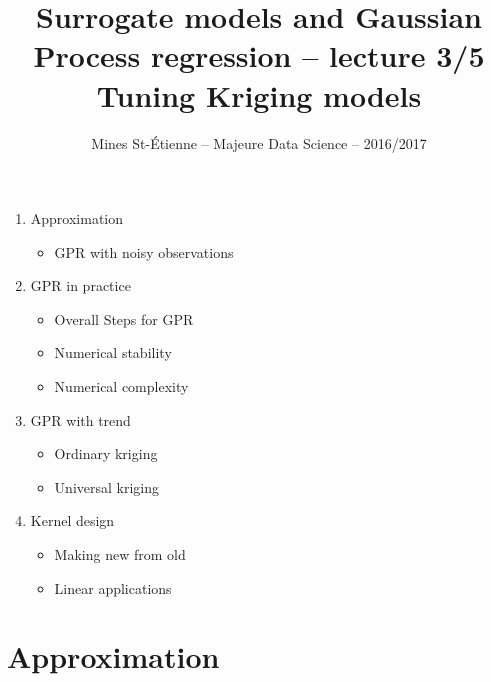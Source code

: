 \documentclass{beamer}
\title[Majeure Data Science -- Surrogate models and GPR]{\texorpdfstring{ \small Surrogate models and Gaussian Process regression -- lecture 3/5 \\ \vspace{3mm} \LARGE Tuning Kriging models}{}}
\author[Mines St-\'Etienne ]{Mines St-\'Etienne -- Majeure Data Science -- 2016/2017}
\institute{\texorpdfstring{Nicolas Durrande (durrande@emse.fr)}{}}
\date{\null}
\begin{document}
\begin{frame}
  \titlepage
\end{frame}

\begin{frame}{}
\vspace{0.75cm}
\vspace{0.3cm}
\begin{enumerate}
    \item Approximation
    \begin{itemize}
    	\item GPR with noisy observations  \vspace{2mm}
    \end{itemize}
    \item GPR in practice
        \begin{itemize}
    		\item Overall Steps for GPR
    		\item Numerical stability
    		\item Numerical complexity  \vspace{2mm}
    	\end{itemize}
    \item GPR with trend
    	\begin{itemize}
    		\item Ordinary kriging
    		\item Universal kriging \vspace{2mm}
    	\end{itemize}
    \item Kernel design
    	\begin{itemize}
    		\item Making new from old
    		\item Linear applications
    	\end{itemize}
\end{enumerate}
\end{frame}


\section{Approximation}
\subsection{}
\end{document}
